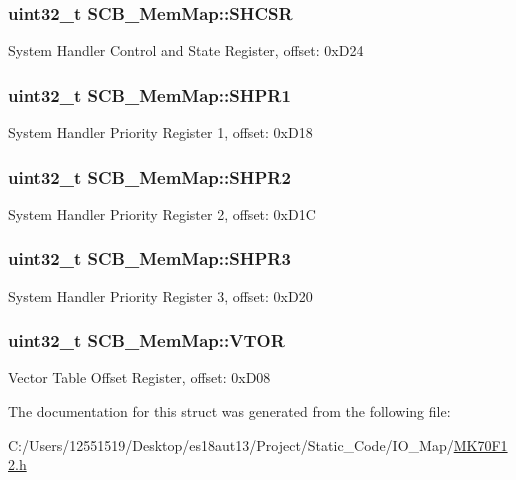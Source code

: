 \subsubsection[{S\+H\+C\+S\+R}]{\setlength{\rightskip}{0pt plus 5cm}uint32\+\_\+t S\+C\+B\+\_\+\+Mem\+Map\+::\+S\+H\+C\+S\+R}\label{struct_s_c_b___mem_map_ae2b73d4b9744b878527466ec57dbfdb7}
System Handler Control and State Register, offset\+: 0x\+D24 \hypertarget{struct_s_c_b___mem_map_afe02d5ca0102ec35b79172d453854ed0}{}
\subsubsection[{S\+H\+P\+R1}]{\setlength{\rightskip}{0pt plus 5cm}uint32\+\_\+t S\+C\+B\+\_\+\+Mem\+Map\+::\+S\+H\+P\+R1}\label{struct_s_c_b___mem_map_afe02d5ca0102ec35b79172d453854ed0}
System Handler Priority Register 1, offset\+: 0x\+D18 \hypertarget{struct_s_c_b___mem_map_a1636322022eb10e4acedf40018708b68}{}
\subsubsection[{S\+H\+P\+R2}]{\setlength{\rightskip}{0pt plus 5cm}uint32\+\_\+t S\+C\+B\+\_\+\+Mem\+Map\+::\+S\+H\+P\+R2}\label{struct_s_c_b___mem_map_a1636322022eb10e4acedf40018708b68}
System Handler Priority Register 2, offset\+: 0x\+D1\+C \hypertarget{struct_s_c_b___mem_map_a8ac3a3b8dd23fb279640b98a95fb796a}{}
\subsubsection[{S\+H\+P\+R3}]{\setlength{\rightskip}{0pt plus 5cm}uint32\+\_\+t S\+C\+B\+\_\+\+Mem\+Map\+::\+S\+H\+P\+R3}\label{struct_s_c_b___mem_map_a8ac3a3b8dd23fb279640b98a95fb796a}
System Handler Priority Register 3, offset\+: 0x\+D20 \hypertarget{struct_s_c_b___mem_map_aa327db1d9948595498fba43acc8d336b}{}
\subsubsection[{V\+T\+O\+R}]{\setlength{\rightskip}{0pt plus 5cm}uint32\+\_\+t S\+C\+B\+\_\+\+Mem\+Map\+::\+V\+T\+O\+R}\label{struct_s_c_b___mem_map_aa327db1d9948595498fba43acc8d336b}
Vector Table Offset Register, offset\+: 0x\+D08 

The documentation for this struct was generated from the following file\+:\begin{DoxyCompactItemize}
\item 
C\+:/\+Users/12551519/\+Desktop/es18aut13/\+Project/\+Static\+\_\+\+Code/\+I\+O\+\_\+\+Map/\hyperlink{_m_k70_f12_8h}{M\+K70\+F12.\+h}\end{DoxyCompactItemize}
